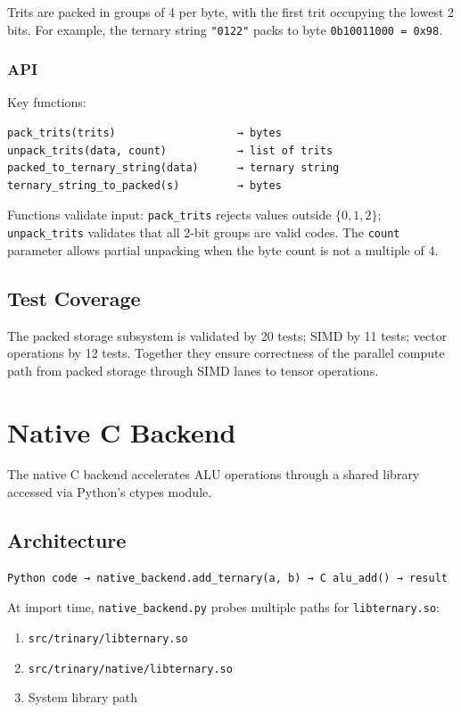 \documentclass[10pt,a4paper,twoside]{book}
\begin{document}
Trits are packed in groups of 4 per byte, with the first trit occupying the
lowest 2 bits. For example, the ternary string \texttt{"0122"} packs to byte
\texttt{0b10011000 = 0x98}.

\subsection{API}

Key functions:
\begin{verbatim}
pack_trits(trits)                   → bytes
unpack_trits(data, count)           → list of trits
packed_to_ternary_string(data)      → ternary string
ternary_string_to_packed(s)         → bytes
\end{verbatim}

Functions validate input: \texttt{pack\_trits} rejects values outside $\{0,1,2\}$;
\texttt{unpack\_trits} validates that all 2-bit groups are valid codes.
The \texttt{count} parameter allows partial unpacking when the byte count is not
a multiple of 4.

\section{Test Coverage}

The packed storage subsystem is validated by 20 tests; SIMD by 11 tests; vector
operations by 12 tests. Together they ensure correctness of the parallel compute
path from packed storage through SIMD lanes to tensor operations.

\chapter{Native C Backend}
\label{ch:native}

The native C backend accelerates ALU operations through a shared library accessed via
Python's ctypes module.

\section{Architecture}

\begin{verbatim}
Python code → native_backend.add_ternary(a, b) → C alu_add() → result
\end{verbatim}

At import time, \texttt{native\_backend.py} probes multiple paths for
\texttt{libternary.so}:
\begin{enumerate}
    \item \texttt{src/trinary/libternary.so}
    \item \texttt{src/trinary/native/libternary.so}
    \item System library path
\end{enumerate}
\end{document}
